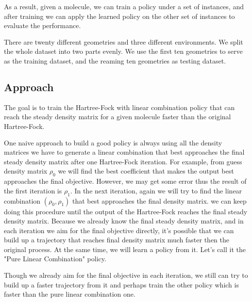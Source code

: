 \documentclass[twoside]{article}
\begin{document}
As a result, given a molecule, we can train a policy under a set of instances, and after training we can apply the learned policy on the other set of instances to evaluate the performance.

There are twenty different geometries and three different environments. We split the whole dataset into two parts evenly. 
We use the first ten geometries to serve as the training dataset, and the reaming ten geometries as testing dataset.

\subsection{Approach}
The goal is to train the Hartree-Fock with linear combination policy that can reach the steady density matrix for a given molecule faster than the original Hartree-Fock.


One naive approach to build a good policy is always using all the density matrices we have to generate a linear combination that best approaches the final steady density matrix after one Hartree-Fock iteration.  For example, from guess density matrix $\rho_0$ we will find the best coefficient that makes the output best approaches the final objective. However, we may get some error thus the result of the first iteration is $\rho_1$.  In the next iteration, again we will try to find the linear combination $(\rho_0, \rho_1)$ that best approaches the final density matrix. we can keep doing this procedure until the output of the Hartree-Fock reaches the final steady density matrix.
Because we already know the final steady density matrix, and in each iteration we aim for the final objective directly, it's possible that we can build up a trajectory that reaches final density matrix much faster then the original process. At the same time, we will learn a policy from it. Let's call it the "Pure Linear Combination" policy.

Though we already aim for the final objective in each iteration, we still can try to build up a faster trajectory from it and perhaps train the other policy which is faster than the pure linear combination one.
\end{document}
